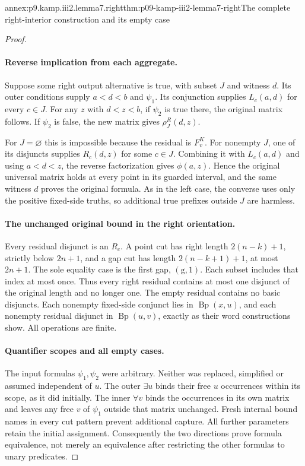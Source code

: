 \begin{annexitem}{annex:p9.kamp.iii2.lemma7.right}{thm:p09-kamp-iii2-lemma7-right}{The complete right-interior construction and its empty case}
\begin{proof}
\paragraph{Reverse implication from each aggregate.}
Suppose some right output alternative is true, with subset \(J\)
and witness \(d\). Its outer conditions supply \(a<d<b\)
and \(\psi_1\). Its conjunction supplies \(L_c(a,d)\)
for every \(c\in J\). For any \(z\) with \(d<z<b\),
if \(\psi_2\) is true there, the original matrix follows.
If \(\psi_2\) is false, the new matrix gives
\(\rho_J^R(d,z)\).

For \(J=\varnothing\) this is impossible because the residual
is \(F^K_v\). For nonempty \(J\), one of its disjuncts
supplies \(R_c(d,z)\) for some \(c\in J\). Combining
it with \(L_c(a,d)\) and using \(a<d<z\), the reverse
factorization gives \(\phi(a,z)\). Hence the original
universal matrix holds at every point in its guarded interval,
and the same witness \(d\) proves the original formula.
As in the left case, the converse uses only the positive fixed-side
truths, so additional true prefixes outside \(J\) are harmless.

\paragraph{The unchanged original bound in the right orientation.}
Every residual disjunct is an \(R_c\). A point cut has right
length \(2(n-k)+1\), strictly below \(2n+1\), and a gap cut
has length \(2(n-k+1)+1\), at most \(2n+1\).
The sole equality case is the first gap, \((\mathrm g,1)\).
Each subset includes that index at most once. Thus every right
residual contains at most one disjunct of the original length and
no longer one. The empty residual contains no basic disjuncts.
Each nonempty fixed-side conjunct lies in
\(\operatorname{Bp}(x,u)\), and each nonempty residual
disjunct in \(\operatorname{Bp}(u,v)\), exactly as their
word constructions show. All operations are finite.

\paragraph{Quantifier scopes and all empty cases.}
The input formulas \(\psi_1,\psi_2\) were arbitrary. Neither
was replaced, simplified or assumed independent of \(u\).
The outer \(\exists u\) binds their free \(u\) occurrences
within its scope, as it did initially. The inner \(\forall v\)
binds the occurrences in its own matrix and leaves any free
\(v\) of \(\psi_1\) outside that matrix unchanged.
Fresh internal bound names in every cut pattern prevent additional
capture. All further parameters retain the initial assignment.
Consequently the two directions prove formula equivalence, not merely
an equivalence after restricting the other formulas to unary predicates.


\end{proof}
\end{annexitem}
